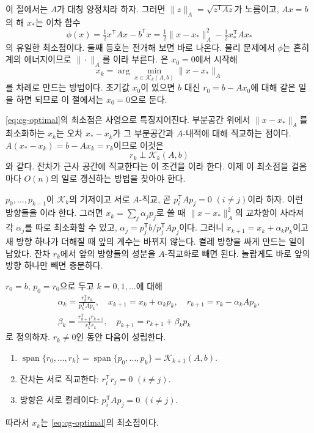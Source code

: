 이 절에서는 $A$가 대칭 양정치라 하자. 그러면 $\|z\|_A=\sqrt{z^{\mathsf T}Az}$가 노름이고, $Ax=b$의 해 $x_\ast$는 이차 함수
\[
\phi(x)=\tfrac12x^{\mathsf T}Ax-b^{\mathsf T}x=\tfrac12\|x-x_\ast\|_A^2-\tfrac12x_\ast^{\mathsf T}Ax_\ast
\]
의 유일한 최소점이다. 둘째 등호는 전개해 보면 바로 나온다. 물리 문제에서 $\phi$는 흔히 계의 에너지이므로 $\|\cdot\|_A$를 이라 부른다. 은 $x_0=0$에서 시작해
\begin{equation}
\label{eq:cg-optimal}
x_k=\arg\min_{x\in\mathcal K_k(A,b)}\|x-x_\ast\|_A
\end{equation}
를 차례로 만드는 방법이다\cite{hestenes1952}. 초기값 $x_0$이 있으면 $b$ 대신 $r_0=b-Ax_0$에 대해 같은 일을 하면 되므로 이 절에서는 $x_0=0$으로 둔다.

\eqref{eq:cg-optimal}의 최소점은 사영으로 특징지어진다. 부분공간 위에서 $\|x-x_\ast\|_A$를 최소화하는 $x_k$는 오차 $x_\ast-x_k$가 그 부분공간과 $A$-내적에 대해 직교하는 점이다. $A(x_\ast-x_k)=b-Ax_k=r_k$이므로 이것은
\begin{equation}
\label{eq:galerkin}
r_k\perp\mathcal K_k(A,b)
\end{equation}
와 같다. 잔차가 근사 공간에 직교한다는 이 조건을 이라 한다. 이제 이 최소점을 걸음마다 $O(n)$의 일로 갱신하는 방법을 찾아야 한다.

$p_0,\dots,p_{k-1}$이 $\mathcal K_k$의 기저이고 서로 $A$-직교, 곧 $p_i^{\mathsf T}Ap_j=0$ $(i\ne j)$이라 하자. 이런 방향들을 이라 한다. 그러면 $x_k=\sum_j\alpha_jp_j$로 쓸 때 $\|x-x_\ast\|_A^2$의 교차항이 사라져 각 $\alpha_j$를 따로 최소화할 수 있고, $\alpha_j=p_j^{\mathsf T}b/p_j^{\mathsf T}Ap_j$이다. 그러니 $x_{k+1}=x_k+\alpha_kp_k$이고 새 방향 하나가 더해질 때 앞의 계수는 바뀌지 않는다. 켤레 방향을 싸게 만드는 일이 남았다. 잔차 $r_k$에서 앞의 방향들의 성분을 $A$-직교화로 빼면 된다. 놀랍게도 바로 앞의 방향 하나만 빼면 충분하다.

\begin{theorem}
\label{thm:cg-short}
$r_0=b$, $p_0=r_0$으로 두고 $k=0,1,\dots$에 대해
\begin{gather*}
\alpha_k=\frac{r_k^{\mathsf T}r_k}{p_k^{\mathsf T}Ap_k},\quad x_{k+1}=x_k+\alpha_kp_k,\quad r_{k+1}=r_k-\alpha_kAp_k,\\
\beta_k=\frac{r_{k+1}^{\mathsf T}r_{k+1}}{r_k^{\mathsf T}r_k},\quad p_{k+1}=r_{k+1}+\beta_kp_k
\end{gather*}
로 정의하자. $r_k\ne0$인 동안 다음이 성립한다.
\begin{enumerate}
\item $\operatorname{span}\{r_0,\dots,r_k\}=\operatorname{span}\{p_0,\dots,p_k\}=\mathcal K_{k+1}(A,b)$.
\item 잔차는 서로 직교한다: $r_i^{\mathsf T}r_j=0$ $(i\ne j)$.
\item 방향은 서로 켤레이다: $p_i^{\mathsf T}Ap_j=0$ $(i\ne j)$.
\end{enumerate}
따라서 $x_k$는 \eqref{eq:cg-optimal}의 최소점이다.
\end{theorem}

